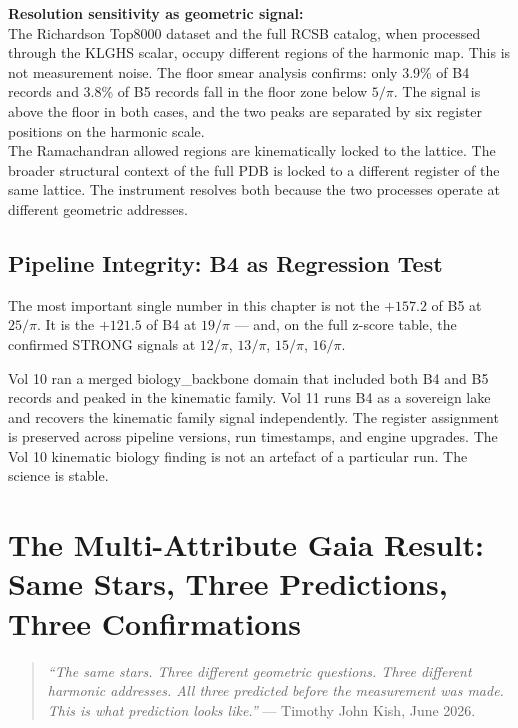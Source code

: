 \documentclass[11pt, letterpaper, openany]{book}
\begin{document}
\begin{empiricalbox}
\begin{discoverybox}
\textbf{Resolution sensitivity as geometric signal:}\\[0.5em]
The Richardson Top8000 dataset and the full RCSB catalog, when processed through
the KLGHS scalar, occupy different regions of the harmonic map. This is not
measurement noise. The floor smear analysis confirms: only 3.9\% of B4 records
and 3.8\% of B5 records fall in the floor zone below $5/\pi$. The signal is
above the floor in both cases, and the two peaks are separated by six register
positions on the harmonic scale.\\[0.5em]
The Ramachandran allowed regions are kinematically locked to the lattice.
The broader structural context of the full PDB is locked to a different
register of the same lattice. The instrument resolves both because the two
processes operate at different geometric addresses.
\end{discoverybox}

\section{Pipeline Integrity: B4 as Regression Test}

The most important single number in this chapter is not the $+157.2$ of B5
at $25/\pi$. It is the $+121.5$ of B4 at $19/\pi$ --- and, on the full
z-score table, the confirmed STRONG signals at $12/\pi$, $13/\pi$, $15/\pi$,
$16/\pi$.

Vol 10 ran a merged biology\_backbone domain that included both B4 and B5
records and peaked in the kinematic family. Vol 11 runs B4 as a sovereign lake
and recovers the kinematic family signal independently. The register assignment
is preserved across pipeline versions, run timestamps, and engine upgrades.
The Vol 10 kinematic biology finding is not an artefact of a particular run.
The science is stable.

\clearpage

\chapter{The Multi-Attribute Gaia Result: Same Stars, Three Predictions, Three Confirmations}

\begin{quote}
\textit{``The same stars. Three different geometric questions. Three different
harmonic addresses. All three predicted before the measurement was made.
This is what prediction looks like.''} --- Timothy John Kish, June 2026.
\end{quote}


\end{empiricalbox}
\end{document}

